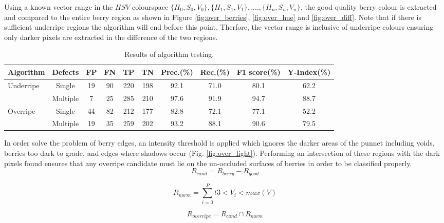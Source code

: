 \documentclass[fleqn,twoside]{article}
\begin{document}
Using a known vector range in the $HSV$ colourspace $\{H_0, S_0, V_0\}, \{H_1, S_1, V_1\},....,\{H_n, S_n, V_n\}$, the good quality berry colour is  extracted and compared to the entire berry region as shown in Figure \ref{fig:over_berries}, \ref{fig:over_hue} and \ref{fig:over_diff}. Note that if there is sufficient underripe regions the algorithm will end before this point. Therfore, the vector range is inclusive of underripe colours ensuring only darker pixels are extracted in the difference of the two regions.

\begin{table}[h]
	\caption{Results of algorithm testing.}
	\label{tab:algo_test}
	\begin{tabularx}{\textwidth}{@{}l*{8}{C}c@{}}
		\toprule
		Algorithm & Defects & FP  & FN  & TP  & TN  & Prec.(\%) & Rec.(\%) & F1 score(\%) & Y-Index(\%)\\ 
		\midrule
		Underripe   & Single   & 19 & 90 & 220 & 198 & 92.1 & 71.0 & 80.1 & 62.2 \\[6pt] 
		& Multiple & 7  & 25 & 285 & 210 & 97.6 & 91.9 & 94.7 & 88.7 \\[6pt]
		Overripe    & Single   & 44 & 82 & 212 & 177 & 82.8 & 72.1 & 77.1 & 52.2 \\[6pt]
		& Multiple & 19 & 35 & 259 & 202 & 93.2 & 88.1 & 90.6 & 79.5 \\[6pt]	 
		\bottomrule
	\end{tabularx}
\end{table}


In order solve the problem of berry edges, an intensity threshold is applied which ignores the darker areas of the punnet including voids, berries too dark to grade, and edges where shadows occur (Fig. \ref{fig:over_light}). Performing an intersection of these regions with the dark pixels found ensures that any overripe candidate must lie on the un-occluded surfaces of berries in order to be classified properly. 
\begin{equation}
R_{cand} = R_{berry} - R_{good}
\label{diff_berry_hue}
\end{equation}

\begin{equation}
R_{norm} = \sum_{i=0}^{P}t3<V_i<max(V)
\label{berry_tops}
\end{equation}

\begin{equation}
R_{overripe} = R_{cand} \cap R_{norm}
\label{intersect_dark_berry}
\end{equation}
\end{document}
